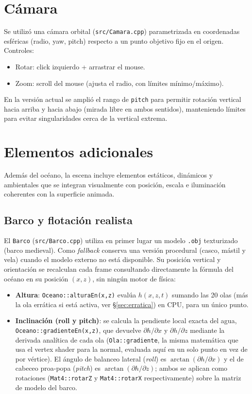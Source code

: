 \documentclass[11pt]{article}
\begin{document}
\section{Cámara}
Se utilizó una cámara orbital (\texttt{src/Camara.cpp}) parametrizada en
coordenadas esféricas (radio, yaw, pitch) respecto a un punto objetivo fijo
en el origen. Controles:
\begin{itemize}
    \item Rotar: click izquierdo + arrastrar el mouse.
    \item Zoom: scroll del mouse (ajusta el radio, con límites mínimo/máximo).
\end{itemize}
En la versión actual se amplió el rango de \texttt{pitch} para permitir
rotación vertical hacia arriba y hacia abajo (mirada libre en ambos sentidos),
manteniendo límites para evitar singularidades cerca de la vertical extrema.

\section{Elementos adicionales}
Además del océano, la escena incluye elementos estáticos, dinámicos y
ambientales que se integran
visualmente con posición, escala e iluminación coherentes con la superficie
animada.

\subsection{Barco y flotación realista}
El \texttt{Barco} (\texttt{src/Barco.cpp}) utiliza en primer lugar un modelo
\texttt{.obj} texturizado (barco medieval). Como \emph{fallback} conserva una
versión procedural (casco, mástil y vela) cuando el modelo externo no está
disponible. Su posición vertical y orientación se recalculan cada frame
consultando directamente la fórmula del océano en su posición $(x,z)$, sin
ningún motor de física:

\begin{itemize}
    \item \textbf{Altura}: \texttt{Oceano::alturaEn(x,z)} evalúa
    $h(x,z,t)$ sumando las 20 olas (más la ola errática si está activa,
    ver \S\ref{sec:erratica}) en CPU, para un único punto.
    \item \textbf{Inclinación (roll y pitch)}: se calcula la pendiente
    local exacta del agua, \texttt{Oceano::gradienteEn(x,z)}, que devuelve
    $\partial h/\partial x$ y $\partial h/\partial z$ mediante la derivada
    analítica de cada ola (\texttt{Ola::gradiente}, la misma matemática que
    usa el vertex shader para la normal, evaluada aquí en un solo punto en
    vez de por vértice). El ángulo de balanceo lateral (\emph{roll}) es
    $\arctan(\partial h/\partial x)$ y el de cabeceo proa-popa
    (\emph{pitch}) es $\arctan(\partial h/\partial z)$; ambos se aplican
    como rotaciones (\texttt{Mat4::rotarZ} y \texttt{Mat4::rotarX}
    respectivamente) sobre la matriz de modelo del barco.
\end{itemize}
\end{document}
